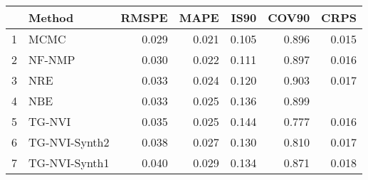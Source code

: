 \documentclass[12pt]{article}
\begin{document}
\thispagestyle{empty}
\begin{table}[ht]
\centering
\begin{tabular}{rlrrrrr}
  \hline
 & Method & RMSPE & MAPE & IS90 & COV90 & CRPS \\ 
  \hline
1 & MCMC & 0.029 & 0.021 & 0.105 & 0.896 & 0.015 \\ 
  2 & NF-NMP & 0.030 & 0.022 & 0.111 & 0.897 & 0.016 \\ 
  3 & NRE & 0.033 & 0.024 & 0.120 & 0.903 & 0.017 \\ 
  4 & NBE & 0.033 & 0.025 & 0.136 & 0.899 &  \\ 
  5 & TG-NVI & 0.035 & 0.025 & 0.144 & 0.777 & 0.016 \\ 
  6 & TG-NVI-Synth2 & 0.038 & 0.027 & 0.130 & 0.810 & 0.017 \\ 
  7 & TG-NVI-Synth1 & 0.040 & 0.029 & 0.134 & 0.871 & 0.018 \\ 
   \hline
\end{tabular}
\end{table}
\end{document}
